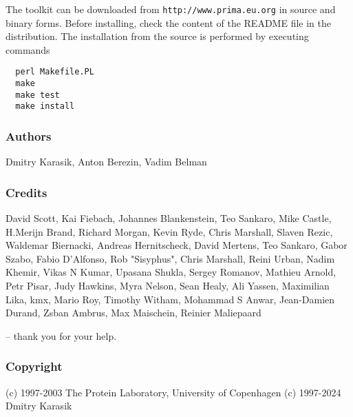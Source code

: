 \documentclass{report}
\begin{document}
The toolkit can be downloaded from \texttt{http://www.prima.eu.org} in
source and binary forms. Before installing, check the content of the README file
in the distribution. The installation from the source is performed by
executing commands
\begin{verbatim}
  perl Makefile.PL
  make
  make test
  make install
\end{verbatim}

\subsubsection{Authors}

Dmitry Karasik,
Anton Berezin,
Vadim Belman

\subsubsection{Credits}

David Scott,
Kai Fiebach,
Johannes Blankenstein,
Teo Sankaro,
Mike Castle,
H.Merijn Brand,
Richard Morgan,
Kevin Ryde,
Chris Marshall,
Slaven Rezic,
Waldemar Biernacki,
Andreas Hernitscheck,
David Mertens,
Teo Sankaro,
Gabor Szabo,
Fabio D'Alfonso,
Rob "Sisyphus",
Chris Marshall,
Reini Urban,
Nadim Khemir,
Vikas N Kumar,
Upasana Shukla,
Sergey Romanov,
Mathieu Arnold,
Petr Pisar,
Judy Hawkins,
Myra Nelson,
Sean Healy,
Ali Yassen,
Maximilian Lika,
kmx,
Mario Roy,
Timothy Witham,
Mohammad S Anwar,
Jean-Damien Durand,
Zsban Ambrus,
Max Maischein,
Reinier Maliepaard

-- thank you for your help.

\subsubsection{Copyright}

(c) 1997-2003 The Protein Laboratory, University of Copenhagen
(c) 1997-2024 Dmitry Karasik
\end{document}

